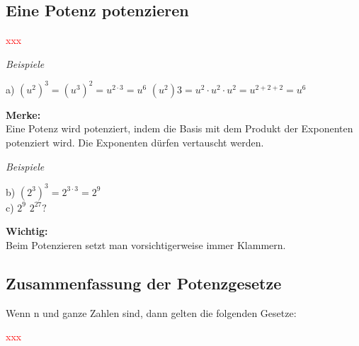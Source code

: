 \documentclass[11pt, a4paper, twoside, fleqn]{article}
\begin{document}
\subsection{Eine Potenz potenzieren}
\textcolor{red}{xxx}
\begin{flushleft}
\emph{Beispiele}
\end{flushleft}
a) \((u^2)^3 = (u^3)^2 = u^{2 \cdot 3} = u^6\)  \((u^2)3 = u^2 \cdot u^2 \cdot u^2 = u^{2+2+2} = u^6\)
\begin{flushleft}
\textbf{Merke:} \\
Eine Potenz wird potenziert, indem die Basis mit dem Produkt der Exponenten potenziert wird. Die Exponenten dürfen vertauscht werden. 
\end{flushleft}
\begin{flushleft}
\emph{Beispiele}
\end{flushleft}
b) \((2^3)^3 = 2^{3 \cdot 3} = 2^9\)  \\ %
c)  %
 \(2^9\)  \(2^{27}?\) 
\begin{flushleft}
\textbf{Wichtig:} \\
Beim Potenzieren setzt man vorsichtigerweise immer Klammern.
\end{flushleft}
\newpage
\subsection{Zusammenfassung der Potenzgesetze}
\begin{flushleft}
Wenn n und ganze Zahlen sind, dann gelten die folgenden Gesetze:
\end{flushleft}
\noindent \textcolor{red}{xxx}
\newpage
\end{document}
